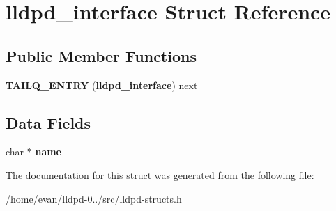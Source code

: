 \section{lldpd\-\_\-interface \-Struct \-Reference}
\label{structlldpd__interface}
\subsection*{\-Public \-Member \-Functions}
\begin{DoxyCompactItemize}
\item 
{\bfseries \-T\-A\-I\-L\-Q\-\_\-\-E\-N\-T\-R\-Y} ({\bf lldpd\-\_\-interface}) next\label{structlldpd__interface_ad1a3487dc567faa7f6012097b9da2443}

\end{DoxyCompactItemize}
\subsection*{\-Data \-Fields}
\begin{DoxyCompactItemize}
\item 
char $\ast$ {\bfseries name}\label{structlldpd__interface_a5ac083a645d964373f022d03df4849c8}

\end{DoxyCompactItemize}


\-The documentation for this struct was generated from the following file\-:\begin{DoxyCompactItemize}
\item 
/home/evan/lldpd-\/0../src/lldpd-\/structs.\-h\end{DoxyCompactItemize}
